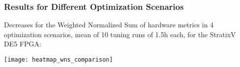 \documentclass[10pt, compress, aspectratio=169]{beamer}
\begin{document}
%
%
%
%

\begin{frame}
    \frametitle{Results for Different Optimization Scenarios}
    Decreases for the \alert{Weighted Normalized Sum} of
    hardware metrics in \alert{4 optimization scenarios}, mean of \alert{10
    tuning runs} of \alert{1.5h each}, for the \alert{StratixV DE5} FPGA:

    \begin{center}
        \texttt{[image: heatmap\_wns\_comparison]}
    \end{center}
\end{frame}
\end{document}
